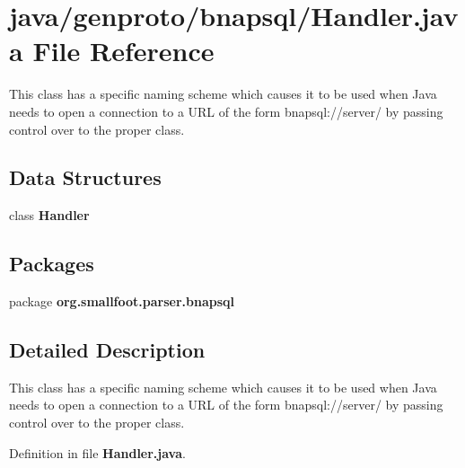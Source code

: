 \section{java/genproto/bnapsql/\+Handler.java File Reference}
\label{genproto_2bnapsql_2Handler_8java}


This class has a specific naming scheme which causes it to be used when Java needs to open a connection to a U\+R\+L of the form bnapsql\+://server/ by passing control over to the proper class.  


\subsection*{Data Structures}
\begin{DoxyCompactItemize}
\item 
class {\bf Handler}
\end{DoxyCompactItemize}
\subsection*{Packages}
\begin{DoxyCompactItemize}
\item 
package {\bf org.\+smallfoot.\+parser.\+bnapsql}
\end{DoxyCompactItemize}


\subsection{Detailed Description}
This class has a specific naming scheme which causes it to be used when Java needs to open a connection to a U\+R\+L of the form bnapsql\+://server/ by passing control over to the proper class. 



Definition in file {\bf Handler.\+java}.

